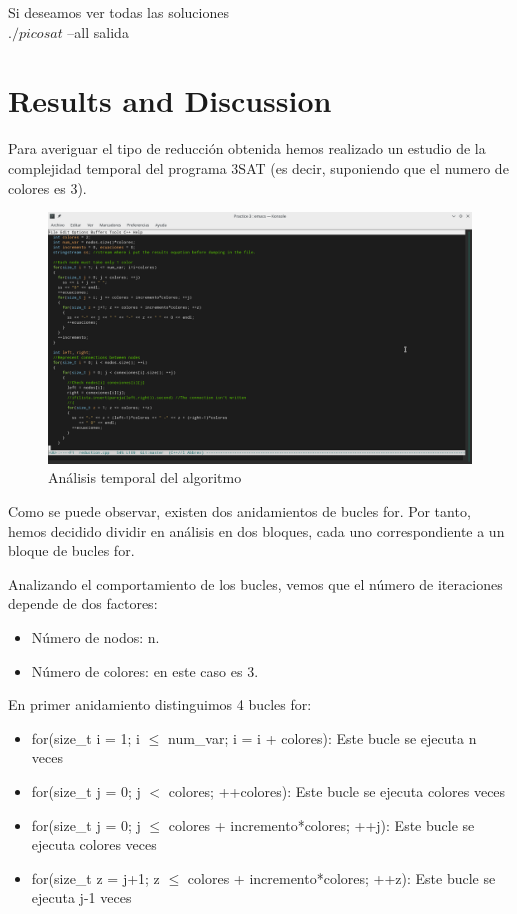 \documentclass{article}
\begin{document}
        Si deseamos ver todas las soluciones \\
         \vspace{5mm} $./picosat$ --all salida


\section{Results and Discussion}
    Para averiguar el tipo de reducción obtenida hemos realizado un estudio de la complejidad temporal del programa 3SAT (es decir, 
    suponiendo que el numero de colores es 3). 
    \begin{figure}[H]
        \centering
        \includegraphics[width=1\textwidth]{pictures/analisis.png}
        \caption{Análisis temporal del algoritmo}
    \end{figure}
    Como se puede observar, existen dos anidamientos de bucles for. Por tanto, hemos decidido dividir en análisis en dos bloques, 
    cada uno correspondiente a un bloque de bucles for. 

    Analizando el comportamiento de los bucles, vemos que el número de iteraciones depende de dos factores: 
    \begin{itemize}
        \item Número de nodos: n.
        \item Número de colores: en este caso es 3.
    \end{itemize}
    En primer anidamiento distinguimos 4 bucles for:
    \begin{itemize}
        \item for(size\_t i = 1; i $\leq$ num\_var; i = i + colores): Este bucle se ejecuta n veces
        \item for(size\_t j = 0; j $<$ colores; ++colores): Este bucle se ejecuta colores veces
        \item for(size\_t j = 0; j $\leq$ colores + incremento*colores; ++j): Este bucle se ejecuta colores veces
        \item for(size\_t z = j+1; z $\leq$ colores + incremento*colores; ++z): Este bucle se ejecuta j-1 veces
    \end{itemize}
    
\end{document}
